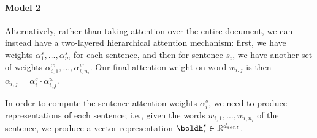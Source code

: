 \documentclass[12pt]{report}
\begin{document}
\paragraph{Model 2} Alternatively, rather than taking attention over the entire document, we can instead have a two-layered hierarchical attention mechanism: first, we have weights $\alpha_1^s, \ldots, \alpha_m^s$ for each sentence, and then for sentence $s_i$, we have another set of weights $\alpha_{i,1}^w, \ldots, \alpha_{i,n_i}^w$.
Our final attention weight on word $w_{i,j}$ is then $\alpha_{i,j} = \alpha_i^s \cdot \alpha_{i,j}^w$.

In order to compute the sentence attention weights $\alpha_i^s$, we need to produce representations of each sentence; i.e., given the words $w_{i,1}, \ldots, w_{i, n_i}$ of the sentence, we produce a vector representation $\boldh^s_i \in \mathbb{R}^{d_{sent}}$.
\end{document}
